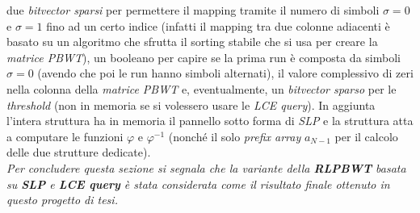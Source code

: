 \documentclass[a4paper,11pt, oneside]{article}
\begin{document}
due \textit{bitvector sparsi} per permettere il mapping tramite il numero di
simboli $\sigma=0$ e $\sigma=1$ fino ad un certo 
indice (infatti il mapping tra due colonne adiacenti è basato su un algoritmo
che sfrutta il sorting stabile che si usa per creare la \textit{matrice PBWT}),
un booleano per capire se la prima run è composta da simboli $\sigma=0$ 
(avendo che poi le run hanno simboli alternati), il valore
complessivo di zeri nella colonna della \textit{matrice PBWT} e, eventualmente,
un \textit{bitvector sparso} per le \textit{threshold} (non in memoria se si
volessero usare le \textit{LCE query}). In aggiunta l'intera struttura ha in
memoria il pannello sotto forma di \textit{SLP} e la struttura atta a computare
le funzioni $\varphi$ e $\varphi^{-1}$ (nonché il solo \textit{prefix array}
$a_{N-1}$ per il calcolo delle due strutture dedicate).\\
\textit{Per concludere questa sezione si segnala che la
  variante 
della \textbf{RLPBWT} basata su \textbf{SLP} e \textbf{LCE query} è stata
considerata come il risultato finale ottenuto in questo progetto di tesi.}
\end{document}
